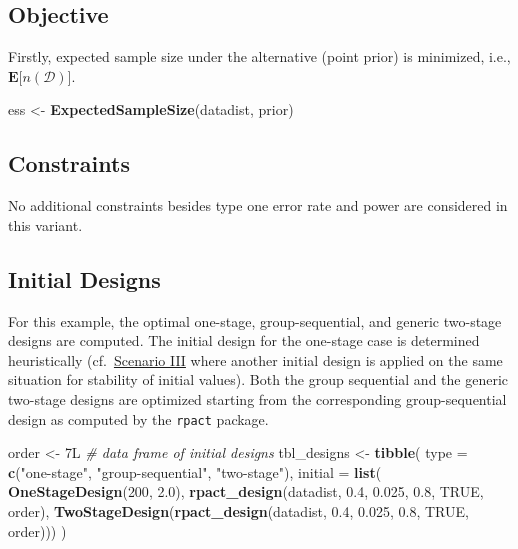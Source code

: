 \documentclass[
]{book}
\newenvironment{Shaded}{\begin{snugshade}}{\end{snugshade}}
\newcommand{\CommentTok}[1]{\textcolor[rgb]{0.56,0.35,0.01}{\textit{#1}}}
\newcommand{\DataTypeTok}[1]{\textcolor[rgb]{0.13,0.29,0.53}{#1}}
\newcommand{\DecValTok}[1]{\textcolor[rgb]{0.00,0.00,0.81}{#1}}
\newcommand{\FloatTok}[1]{\textcolor[rgb]{0.00,0.00,0.81}{#1}}
\newcommand{\KeywordTok}[1]{\textcolor[rgb]{0.13,0.29,0.53}{\textbf{#1}}}
\newcommand{\NormalTok}[1]{#1}
\newcommand{\OtherTok}[1]{\textcolor[rgb]{0.56,0.35,0.01}{#1}}
\newcommand{\StringTok}[1]{\textcolor[rgb]{0.31,0.60,0.02}{#1}}
\begin{document}
\hypertarget{objective}{%
\subsection{Objective}\label{objective}}

Firstly, expected sample size under the alternative (point prior)
is minimized, i.e.,
\(\boldsymbol{E}\big[n(\mathcal{D})\big]\).

\begin{Shaded}
\begin{Highlighting}[]
\NormalTok{ess <-}\StringTok{ }\KeywordTok{ExpectedSampleSize}\NormalTok{(datadist, prior)}
\end{Highlighting}
\end{Shaded}

\hypertarget{constraints}{%
\subsection{Constraints}\label{constraints}}

No additional constraints besides type one error rate and power
are considered in this variant.

\hypertarget{initial-designs}{%
\subsection{Initial Designs}\label{initial-designs}}

For this example, the optimal one-stage, group-sequential, and generic
two-stage designs are computed.
The initial design for the one-stage case is determined heuristically
(cf.~\protect\hyperlink{scenarioIII}{Scenario III} where another initial design is applied
on the same situation for stability of initial values).
Both the group sequential and the generic two-stage designs are
optimized starting from the corresponding group-sequential design as
computed by the \texttt{rpact} package.

\begin{Shaded}
\begin{Highlighting}[]
\NormalTok{order <-}\StringTok{ }\NormalTok{7L}
\CommentTok{# data frame of initial designs }
\NormalTok{tbl_designs <-}\StringTok{ }\KeywordTok{tibble}\NormalTok{(}
    \DataTypeTok{type    =} \KeywordTok{c}\NormalTok{(}\StringTok{"one-stage"}\NormalTok{, }\StringTok{"group-sequential"}\NormalTok{, }\StringTok{"two-stage"}\NormalTok{),}
    \DataTypeTok{initial =} \KeywordTok{list}\NormalTok{(}
        \KeywordTok{OneStageDesign}\NormalTok{(}\DecValTok{200}\NormalTok{, }\FloatTok{2.0}\NormalTok{),}
        \KeywordTok{rpact_design}\NormalTok{(datadist, }\FloatTok{0.4}\NormalTok{, }\FloatTok{0.025}\NormalTok{, }\FloatTok{0.8}\NormalTok{, }\OtherTok{TRUE}\NormalTok{, order),}
        \KeywordTok{TwoStageDesign}\NormalTok{(}\KeywordTok{rpact_design}\NormalTok{(datadist, }\FloatTok{0.4}\NormalTok{, }\FloatTok{0.025}\NormalTok{, }\FloatTok{0.8}\NormalTok{, }\OtherTok{TRUE}\NormalTok{, order))) )}
\end{Highlighting}
\end{Shaded}
\end{document}
